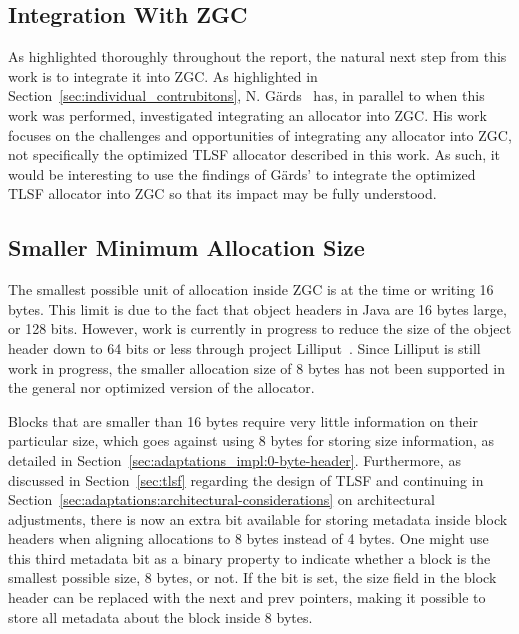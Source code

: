 
\subsection{Integration With ZGC}
\label{sec:future-work:integration}

As highlighted thoroughly throughout the report, the natural next step from this work is to integrate it into ZGC. As highlighted in Section~\ref{sec:individual_contrubitons}, N. Gärds~\cite{niclas_report} has, in parallel to when this work was performed, investigated integrating an allocator into ZGC. His work focuses on the challenges and opportunities of integrating any allocator into ZGC, not specifically the optimized TLSF allocator described in this work. As such, it would be interesting to use the findings of Gärds' to integrate the optimized TLSF allocator into ZGC so that its impact may be fully understood.

\subsection{Smaller Minimum Allocation Size}
\label{sec:future-work:lilliput}

The smallest possible unit of allocation inside ZGC is at the time or writing 16 bytes. This limit is due to the fact that object headers in Java are 16 bytes large, or 128 bits. However, work is currently in progress to reduce the size of the object header down to 64 bits or less through project Lilliput~\cite{lilliput}. Since Lilliput is still work in progress, the smaller allocation size of 8 bytes has not been supported in the general nor optimized version of the allocator.

Blocks that are smaller than 16 bytes require very little information on their particular size, which goes against using 8 bytes for storing size information, as detailed in Section~\ref{sec:adaptations_impl:0-byte-header}. Furthermore, as discussed in Section~\ref{sec:tlsf} regarding the design of TLSF and continuing in Section~\ref{sec:adaptations:architectural-considerations} on architectural adjustments, there is now an extra bit available for storing metadata inside block headers when aligning allocations to 8 bytes instead of 4 bytes. One might use this third metadata bit as a binary property to indicate whether a block is the smallest possible size, 8 bytes, or not. If the bit is set, the size field in the block header can be replaced with the next and prev pointers, making it possible to store all metadata about the block inside 8 bytes.

